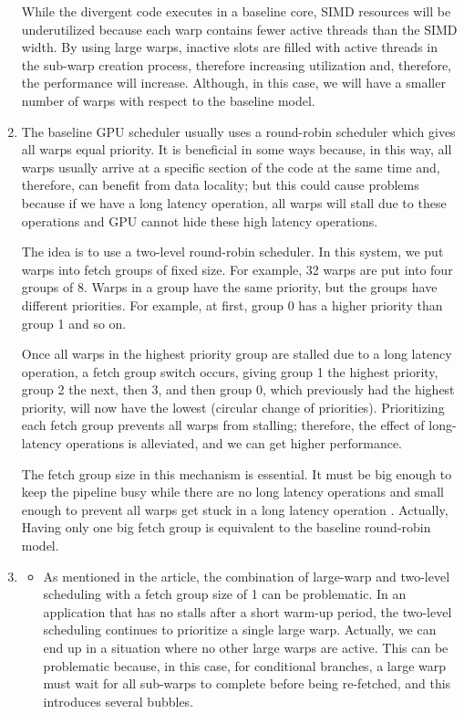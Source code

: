 \documentclass[12pt]{article}
\begin{document}
\begin{enumerate}[label=\alph*)]
While the divergent code executes in a baseline core, SIMD resources will be underutilized because each warp contains fewer active threads than the SIMD width. By using large warps, inactive slots are filled with active threads in the sub-warp creation process, therefore increasing utilization and, therefore, the performance will increase. Although, in this case, we will have a smaller number of warps with respect to the baseline model.

\item 

The baseline GPU scheduler usually uses a round-robin scheduler which gives all warps equal priority. It is beneficial in some ways because, in this way, all warps usually arrive at a specific section of the code at the same time and, therefore, can benefit from data locality; but this could cause problems because if we have a long latency operation, all warps will stall due to these operations and GPU cannot hide these high latency operations. 

The idea is to use a two-level round-robin scheduler. In this system, we put warps into fetch groups of fixed size. For example, 32 warps are put into four groups of 8. Warps in a group have the same priority, but the groups have different priorities. For example, at first, group 0 has a higher priority than group 1 and so on.

Once all warps in the highest priority group are stalled due to a long latency operation, a fetch group switch occurs, giving group 1 the highest priority, group 2 the next, then 3, and then group 0, which previously had the highest priority, will now have the lowest (circular change of priorities). Prioritizing each fetch group prevents all warps from stalling; therefore, the effect of long-latency operations is alleviated, and we can get higher performance. 


The fetch group size in this mechanism is essential. It must be big enough to keep the pipeline busy while there are no long latency operations and small enough to prevent all warps get stuck in a long latency operation . Actually, Having only one big fetch group is equivalent to the baseline round-robin model.

\item 

\begin{itemize}
	\item As mentioned in the article, the combination of large-warp and two-level scheduling with a fetch group size of 1 can be problematic. In an application that has no stalls after a short warm-up period, the two-level scheduling continues to prioritize a single large warp. Actually, we can end up in a situation where no other large warps are active. This can be problematic because, in this case, for conditional branches, a large warp must wait for all sub-warps to complete before being re-fetched, and this introduces several bubbles.
	

\end{itemize}
\end{enumerate}
\end{document}

